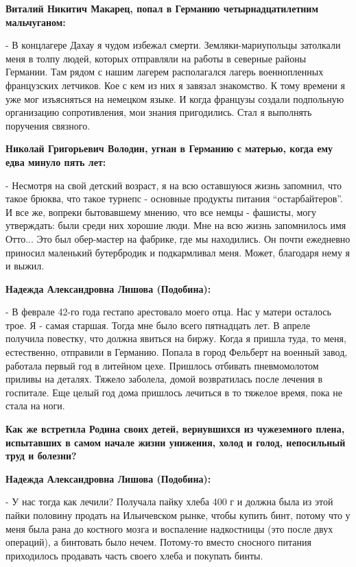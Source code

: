 \textbf{Виталий Никитич Макарец, попал в Германию четырнадцатилетним мальчуганом:}

- В концлагере Дахау я чудом избежал смерти. Земляки-мариупольцы затолкали меня
в толпу людей, которых отправляли на работы в северные районы Германии. Там
рядом с нашим лагерем располагался лагерь военнопленных французских летчиков.
Кое с кем из них я завязал знакомство. К тому времени я уже мог изъясняться на
немецком языке. И когда французы создали подпольную организацию сопротивления,
мои знания пригодились. Стал я выполнять поручения связного.

\textbf{Николай Григорьевич Володин, угнан в Германию с матерью, когда ему едва минуло пять лет:}

- Несмотря на свой детский возраст, я на всю оставшуюся жизнь запомнил, что
такое брюква, что такое турнепс - основные продукты питания \enquote{остарбайтеров}. И
все же, вопреки бытовавшему мнению, что все немцы - фашисты, могу утверждать:
были среди них хорошие люди. Мне на всю жизнь запомнилось имя Отто... Это был
обер-мастер на фабрике, где мы находились. Он почти ежедневно приносил
маленький бутербродик и подкармливал меня. Может, благодаря нему я и выжил.

\textbf{Надежда Александровна Лишова (Подобина):}

- В феврале 42-го года гестапо арестовало моего отца. Нас у матери осталось
трое. Я - самая старшая. Тогда мне было всего пятнадцать лет. В апреле получила
повестку, что должна явиться на биржу. Когда я пришла туда, то меня,
естественно, отправили в Германию. Попала в город Фельберт на военный завод,
работала первый год в литейном цехе. Пришлось отбивать пневмомолотом приливы на
деталях. Тяжело заболела, домой возвратилась после лечения в госпитале. Еще
целый год дома пришлось лечиться в то тяжелое время, пока не стала на ноги.

\textbf{Как же встретила Родина своих детей, вернувшихся из чужеземного плена,
испытавших в самом начале жизни унижения, холод и голод, непосильный труд и
болезни?}

\textbf{Надежда Александровна Лишова (Подобина):}

- У нас тогда как лечили? Получала пайку хлеба 400 г и должна была из этой
пайки половину продать на Ильичевском рынке, чтобы купить бинт, потому что у
меня была рана до костного мозга и воспаление надкостницы (это после двух
операций), а бинтовать было нечем. Потому-то вместо сносного питания
приходилось продавать часть своего хлеба и покупать бинты.

